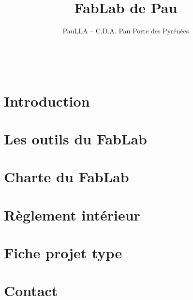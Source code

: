 \documentclass[a5paper,11pt]{article} %
\title{FabLab de Pau} %
\author{PauLLA -- C.D.A. Pau Porte des Pyrénées}
\begin{document}
\thispagestyle{empty}

\pagebreak
~ \vfill %
\tableofcontents\thispagestyle{empty}
~ \vfill %
\pagebreak\section{Introduction}

\pagebreak\section{Les outils du FabLab}

\pagebreak\section{Charte du FabLab}

\pagebreak\section{Règlement intérieur}

\pagebreak\section{Fiche projet type}

\pagebreak\section{Contact}

\end{document}

